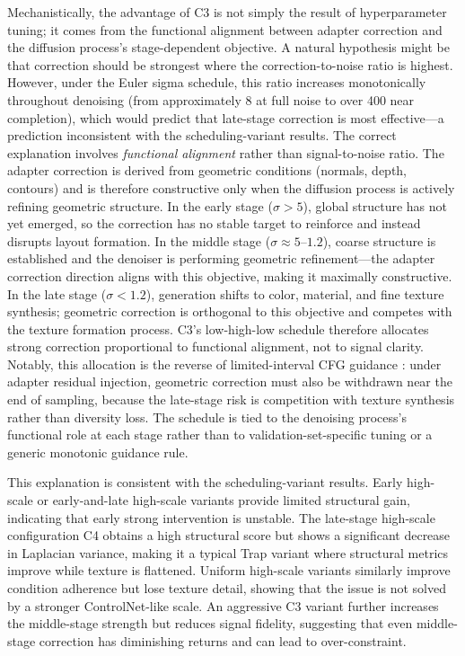\documentclass[times,twocolumn,final]{elsarticle}
\begin{document}
Mechanistically, the advantage of C3 is not simply the result of hyperparameter tuning; it comes from the functional alignment between adapter correction and the diffusion process's stage-dependent objective. A natural hypothesis might be that correction should be strongest where the correction-to-noise ratio is highest. However, under the Euler sigma schedule, this ratio increases monotonically throughout denoising (from approximately 8 at full noise to over 400 near completion), which would predict that late-stage correction is most effective---a prediction inconsistent with the scheduling-variant results. The correct explanation involves \emph{functional alignment} rather than signal-to-noise ratio. The adapter correction is derived from geometric conditions (normals, depth, contours) and is therefore constructive only when the diffusion process is actively refining geometric structure. In the early stage ($\sigma > 5$), global structure has not yet emerged, so the correction has no stable target to reinforce and instead disrupts layout formation. In the middle stage ($\sigma \approx 5$--$1.2$), coarse structure is established and the denoiser is performing geometric refinement---the adapter correction direction aligns with this objective, making it maximally constructive. In the late stage ($\sigma < 1.2$), generation shifts to color, material, and fine texture synthesis; geometric correction is orthogonal to this objective and competes with the texture formation process. C3's low-high-low schedule therefore allocates strong correction proportional to functional alignment, not to signal clarity. Notably, this allocation is the reverse of limited-interval CFG guidance \cite{kynkanniemi2024limited}: under adapter residual injection, geometric correction must also be withdrawn near the end of sampling, because the late-stage risk is competition with texture synthesis rather than diversity loss. The schedule is tied to the denoising process's functional role at each stage rather than to validation-set-specific tuning or a generic monotonic guidance rule.

This explanation is consistent with the scheduling-variant results. Early high-scale or early-and-late high-scale variants provide limited structural gain, indicating that early strong intervention is unstable. The late-stage high-scale configuration C4 obtains a high structural score but shows a significant decrease in Laplacian variance, making it a typical Trap variant where structural metrics improve while texture is flattened. Uniform high-scale variants similarly improve condition adherence but lose texture detail, showing that the issue is not solved by a stronger ControlNet-like scale. An aggressive C3 variant further increases the middle-stage strength but reduces signal fidelity, suggesting that even middle-stage correction has diminishing returns and can lead to over-constraint.
\end{document}

